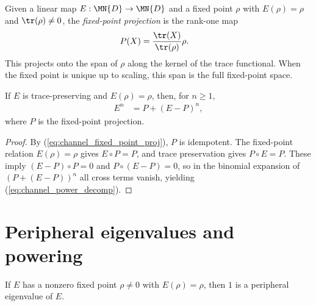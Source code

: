 \begin{definition}\label{def:fixed_point_proj}
    \leanok
    Given a linear map $E:\MN{D}\to\MN{D}$ and a fixed point
    $\rho$ with $E(\rho)=\rho$ and $\tr(\rho)\neq0$,
    the \emph{fixed-point projection} is the rank-one map
    \begin{align}
        P(X)
         & =\frac{\tr(X)}{\tr(\rho)}\rho.
        \label{eq:channel_fixed_point_proj}
    \end{align}
    This projects onto the span of $\rho$ along the kernel of the
    trace functional. When the fixed point is unique up to scaling,
    this span is the full fixed-point space.
\end{definition}

\begin{theorem}\label{thm:pow_decomp}
    \leanok
    If $E$ is trace-preserving and $E(\rho)=\rho$, then, for $n\geq1$,
    \begin{align}
        E^n
         & =P+(E-P)^n,
        \label{eq:channel_power_decomp}
    \end{align}
    where $P$ is the fixed-point projection.
\end{theorem}

\begin{proof}
    \leanok
    By (\ref{eq:channel_fixed_point_proj}), $P$ is idempotent.
    The fixed-point relation $E(\rho)=\rho$ gives $E\circ P=P$, and trace
    preservation gives $P\circ E=P$. These imply
    $(E-P)\circ P=0$ and $P\circ(E-P)=0$, so in the binomial expansion of
    $(P+(E-P))^n$ all cross terms vanish, yielding
    (\ref{eq:channel_power_decomp}).
\end{proof}

\section{Peripheral eigenvalues and powering}


\begin{theorem}\label{thm:one_peripheral}
    \leanok
    If $E$ has a nonzero fixed point $\rho\neq0$ with $E(\rho)=\rho$,
    then $1$ is a peripheral eigenvalue of $E$.
\end{theorem}

